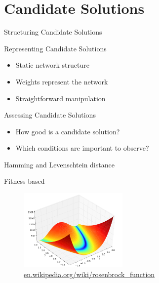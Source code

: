 \section{Candidate Solutions}

\begin{frame}{Structuring Candidate Solutions}
  \begin{center}
    
  \end{center}
\end{frame}

\begin{frame}{Representing Candidate Solutions}
  \begin{itemize}
    \item Static network structure
    \item Weights represent the network
    \item Straightforward manipulation
  \end{itemize}
\end{frame}

\begin{frame}{Assessing Candidate Solutions}
  \begin{itemize}
    \item How good is a candidate solution?
    \item Which conditions are important to observe?
  \end{itemize}
\end{frame}


\begin{frame}{Hamming and Levenschtein distance}
  
\end{frame}

\begin{frame}{Fitness-based}
  \begin{figure}
    \centering
    \includegraphics[height=150px]{elias/images/elevation.png}
    \caption{\url{en.wikipedia.org/wiki/rosenbrock_function}}
  \end{figure}
\end{frame}

